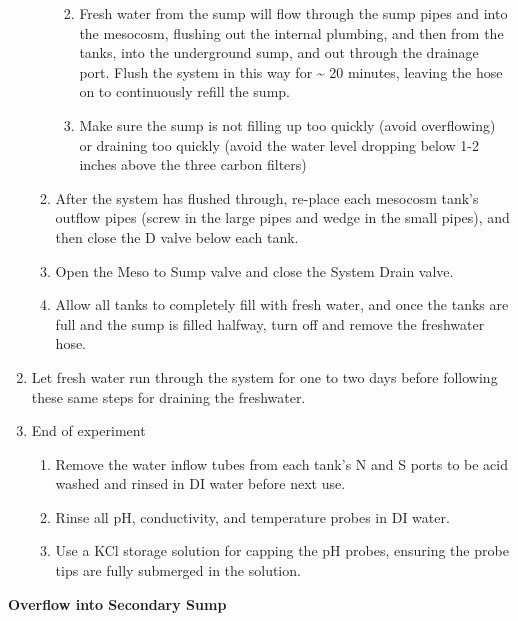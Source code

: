 \documentclass[
]{book}
\providecommand{\tightlist}{%
  \setlength{\itemsep}{0pt}\setlength{\parskip}{0pt}}
\begin{document}
\begin{enumerate}
\begin{enumerate}
    \begin{enumerate}
    \def\labelenumiii{\arabic{enumiii}.}
    \tightlist
    \item
      Fresh water from the sump will flow through the sump pipes and into the mesocosm, flushing out the internal plumbing, and then from the tanks, into the underground sump, and out through the drainage port. Flush the system in this way for \textasciitilde{} 20 minutes, leaving the hose on to continuously refill the sump.
    \item
      Make sure the sump is not filling up too quickly (avoid overflowing) or draining too quickly (avoid the water level dropping below 1-2 inches above the three carbon filters)
    \end{enumerate}
  \item
    After the system has flushed through, re-place each mesocosm tank's outflow pipes (screw in the large pipes and wedge in the small pipes), and then close the D valve below each tank.
  \item
    Open the Meso to Sump valve and close the System Drain valve.
  \item
    Allow all tanks to completely fill with fresh water, and once the tanks are full and the sump is filled halfway, turn off and remove the freshwater hose.
  \end{enumerate}
\item
  Let fresh water run through the system for one to two days before following these same steps for draining the freshwater.
\item
  End of experiment

  \begin{enumerate}
  \def\labelenumii{\arabic{enumii}.}
  \tightlist
  \item
    Remove the water inflow tubes from each tank's N and S ports to be acid washed and rinsed in DI water before next use.
  \item
    Rinse all pH, conductivity, and temperature probes in DI water.
  \item
    Use a KCl storage solution for capping the pH probes, ensuring the probe tips are fully submerged in the solution.
  \end{enumerate}
\end{enumerate}

\textbf{Overflow into Secondary Sump}
\end{document}
